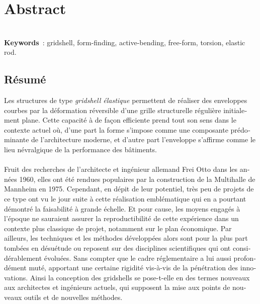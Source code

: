 
\cleardoublepage
\chapter*{Abstract}
\vspace{12pt}\\
\textbf{Keywords}~: gridshell, form-finding, active-bending, free-form, torsion, elastic rod.

\begin{otherlanguage}{french}
\cleardoublepage
\chapter*{Résumé}
Les structures de type \emph{gridshell élastique} permettent de réaliser des enveloppes courbes par la déformation réversible d'une grille structurelle régulière initialement plane. Cette capacité à  de façon efficiente prend tout son sens dans le contexte actuel où, d’une part la forme s'impose comme une composante prédominante de l'architecture moderne, et d’autre part l'enveloppe s'affirme comme le lieu névralgique de la performance des bâtiments.
\\
\\
Fruit des recherches de l'architecte et ingénieur allemand Frei Otto dans les années 1960, elles ont été rendues populaires par la construction de la Multihalle de Mannheim en 1975. Cependant, en dépit de leur potentiel, très peu de projets de ce type ont vu le jour suite à cette réalisation emblématique qui en a pourtant démontré la faisabilité à grande échelle. Et pour cause, les moyens engagés à l'époque ne sauraient assurer la reproductibilité de cette expérience dans un contexte plus classique de projet, notamment sur le plan économique. Par ailleurs, les techniques et les méthodes développées alors sont pour la plus part tombées en désuétude ou reposent sur des disciplines scientifiques qui ont considérablement évoluées. Sans compter que le cadre réglementaire a lui aussi profondément muté, apportant une certaine rigidité vis-à-vis de la pénétration des innovations. Ainsi la conception des gridshells se pose-t-elle en des termes nouveaux aux architectes et ingénieurs actuels, qui supposent la mise aux points de nouveaux outils et de nouvelles méthodes.

\end{otherlanguage}
